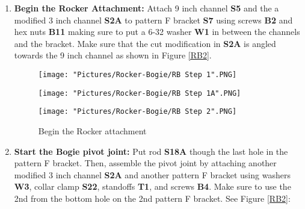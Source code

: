 \documentclass[12pt]{article}
\begin{document}
\begin{enumerate}
\item \textbf{Begin the Rocker Attachment:}  Attach 9 inch channel \textbf{S5} and the a modified 3 inch channel \textbf{S2A} to pattern F bracket \textbf{S7} using screws \textbf{B2} and hex nuts \textbf{B11} making sure to put a 6-32 washer \textbf{W1} in between the channels and the bracket. Make sure that the cut modification in \textbf{S2A} is angled towards the 9 inch channel as shown in Figure \ref {RB2}.

\begin{figure}[H]
  	\centering
  	\begin{minipage}[b]{0.30\textwidth}
    		\texttt{[image: "Pictures/Rocker-Bogie/RB Step 1".PNG]}
  	\end{minipage}
  	\hfill
  	\begin{minipage}[b]{0.30\textwidth}
    		\texttt{[image: "Pictures/Rocker-Bogie/RB Step 1A".PNG]}
  	\end{minipage}
    	\hfill
  	\begin{minipage}[b]{0.30\textwidth}
    		\texttt{[image: "Pictures/Rocker-Bogie/RB Step 2".PNG]}
  	\end{minipage}
  	\caption{Begin the Rocker attachment}
\end{figure}



\item \textbf{Start the Bogie pivot joint:} Put rod \textbf{S18A} though the last hole in the pattern F bracket. Then,  assemble the pivot joint by attaching another modified 3 inch channel \textbf{S2A} and another pattern F bracket using washers \textbf{W3}, collar clamp \textbf{S22}, standoffs \textbf{T1}, and screws \textbf{B4}. Make sure to use the 2nd from the bottom hole on the 2nd pattern F bracket. See Figure \ref{RB2}:



\end{enumerate}
\end{document}
